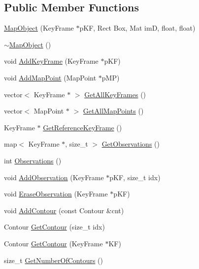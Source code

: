 \subsection*{Public Member Functions}
\begin{DoxyCompactItemize}
\item 
\hyperlink{classMapObject_a71c517c239a9d3e428814d5ae7ca0f37}{Map\+Object} (Key\+Frame $\ast$p\+KF, Rect Box, Mat imD, float, float)
\item 
\hyperlink{classMapObject_aa601344267a49df197e841fcbd732209}{$\sim$\+Map\+Object} ()
\item 
void \hyperlink{classMapObject_aea6cf6d21fd0f6f16f20f104649fb123}{Add\+Key\+Frame} (Key\+Frame $\ast$p\+KF)
\item 
void \hyperlink{classMapObject_ad45dc696e85bae95d002e221be2a8485}{Add\+Map\+Point} (Map\+Point $\ast$p\+MP)
\item 
vector$<$ Key\+Frame $\ast$ $>$ \hyperlink{classMapObject_a70a913eddc982932db2946a9e9a70a60}{Get\+All\+Key\+Frames} ()
\item 
vector$<$ Map\+Point $\ast$ $>$ \hyperlink{classMapObject_a699833bb841163ead45dfb54b79a06d6}{Get\+All\+Map\+Points} ()
\item 
Key\+Frame $\ast$ \hyperlink{classMapObject_ae25efc757c7b2556b38c26fab6ed3810}{Get\+Reference\+Key\+Frame} ()
\item 
map$<$ Key\+Frame $\ast$, size\+\_\+t $>$ \hyperlink{classMapObject_a6250980493cff6ade7fd7abb297bfc22}{Get\+Observations} ()
\item 
int \hyperlink{classMapObject_ae024e07f50f458df9499afee3f10dca6}{Observations} ()
\item 
void \hyperlink{classMapObject_a750e565627cee16dd29b66efe68e4c5c}{Add\+Observation} (Key\+Frame $\ast$p\+KF, size\+\_\+t idx)
\item 
void \hyperlink{classMapObject_a3f866f4570a8eef20b480d199cac6445}{Erase\+Observation} (Key\+Frame $\ast$p\+KF)
\item 
void \hyperlink{classMapObject_a1c001878f240b0193ee4c7f334f39ec6}{Add\+Contour} (const Contour \&cnt)
\item 
Contour \hyperlink{classMapObject_a6262e6f97be97cbee77ab0f2a0606d6f}{Get\+Contour} (size\+\_\+t idx)
\item 
Contour \hyperlink{classMapObject_a4f06564949f6bba3ef19c40b8ffd23cf}{Get\+Contour} (Key\+Frame $\ast$KF)
\item 
size\+\_\+t \hyperlink{classMapObject_ab91bdbe9cedc8165e4277d377f177285}{Get\+Number\+Of\+Contours} ()

\end{DoxyCompactItemize}
